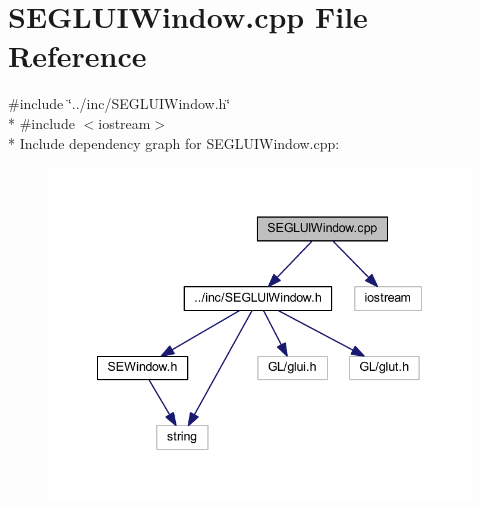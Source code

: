 \section{S\+E\+G\+L\+U\+I\+Window.\+cpp File Reference}
\label{_s_e_g_l_u_i_window_8cpp}
{\ttfamily \#include \char`\"{}../inc/\+S\+E\+G\+L\+U\+I\+Window.\+h\char`\"{}}\\*
{\ttfamily \#include $<$iostream$>$}\\*
Include dependency graph for S\+E\+G\+L\+U\+I\+Window.\+cpp\+:
\nopagebreak
\begin{figure}[H]
\begin{center}
\leavevmode
\includegraphics[width=342pt]{_s_e_g_l_u_i_window_8cpp__incl}
\end{center}
\end{figure}
